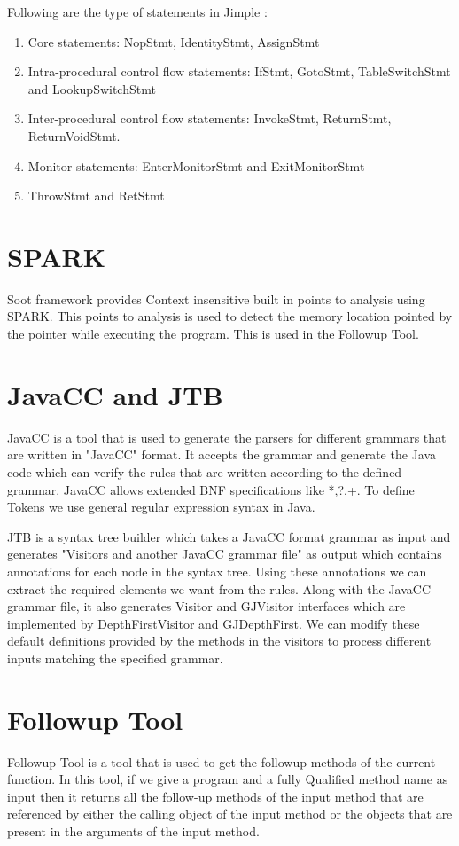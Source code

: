 Following are the type of statements in Jimple :
\begin{enumerate} [blt]
    \item Core statements: NopStmt, IdentityStmt, AssignStmt
    \item Intra-procedural control flow statements: IfStmt, GotoStmt, TableSwitchStmt and LookupSwitchStmt
    \item  Inter-procedural control flow statements: InvokeStmt, ReturnStmt, ReturnVoidStmt.
    \item Monitor statements: EnterMonitorStmt and ExitMonitorStmt
    \item ThrowStmt and RetStmt
\end{enumerate}


\section{SPARK}
Soot framework provides Context insensitive built in points to analysis using SPARK. This points to analysis is used to detect the memory location pointed by the pointer while executing the program. This is used in the Followup Tool.

\section{JavaCC and JTB}
JavaCC \cite{JavaCC} is a tool that is used to generate the parsers for different grammars that are written in "JavaCC" format. It accepts the grammar and generate the Java code which can verify the rules that are written according to the defined grammar. JavaCC allows extended BNF specifications like *,?,+. To define Tokens we use general regular expression syntax in Java.

JTB \cite{JTB} is a syntax tree builder which takes a JavaCC format grammar as input and generates "Visitors and another JavaCC grammar file" as output which contains annotations for each node in the syntax tree. Using these annotations we can extract the required elements we want from the rules. Along with the JavaCC grammar file, it also generates Visitor and GJVisitor interfaces which are implemented by DepthFirstVisitor and GJDepthFirst. We can modify these default definitions provided by the methods in the visitors to process different inputs matching the specified grammar.

\section{Followup Tool}
Followup Tool \cite{Vishnu_Kiran} is a tool that is used to get the followup methods of the current function. In this tool, if we give a program and a fully Qualified method name as input then it returns all the follow-up methods of the input method that are referenced by either the calling object of the input method or the objects that are present in the arguments of the input method.

